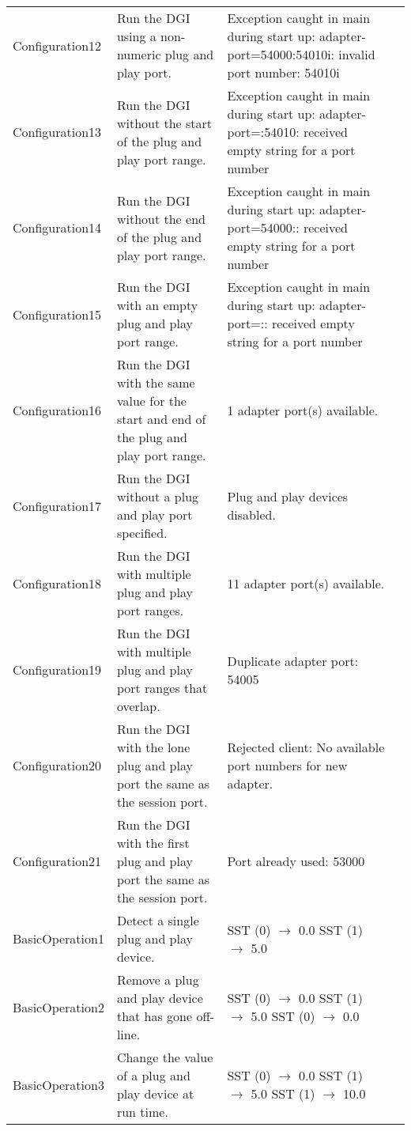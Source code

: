 \documentclass{article}
\begin{document}
\begin{center}
\begin{footnotesize}
\begin{longtable}{|p{3cm}|p{4cm}|p{10cm}|c|}
    Configuration12 & Run the DGI using a non-numeric plug and play port. & Exception caught in main during start up: adapter-port=54000:54010i: invalid port number: 54010i & \\
    Configuration13 & Run the DGI without the start of the plug and play port range. & Exception caught in main during start up: adapter-port=:54010: received empty string for a port number & \\
    Configuration14 & Run the DGI without the end of the plug and play port range. & Exception caught in main during start up: adapter-port=54000:: received empty string for a port number & \\
    Configuration15 & Run the DGI with an empty plug and play port range. & Exception caught in main during start up: adapter-port=:: received empty string for a port number & \\
    Configuration16 & Run the DGI with the same value for the start and end of the plug and play port range. & 1 adapter port(s) available. & \\
    Configuration17 & Run the DGI without a plug and play port specified. & Plug and play devices disabled. & \\
    Configuration18 & Run the DGI with multiple plug and play port ranges. & 11 adapter port(s) available. & \\
    Configuration19 & Run the DGI with multiple plug and play port ranges that overlap. & Duplicate adapter port: 54005 & \\
    Configuration20 & Run the DGI with the lone plug and play port the same as the session port. & Rejected client: No available port numbers for new adapter. & \\
    Configuration21 & Run the DGI with the first plug and play port the same as the session port. & Port already used: 53000 & \\
    BasicOperation1 & Detect a single plug and play device. & SST (0) $\rightarrow$ 0.0 \newline SST (1) $\rightarrow$ 5.0 & \\
    BasicOperation2 & Remove a plug and play device that has gone off-line. & SST (0) $\rightarrow$ 0.0 \newline SST (1) $\rightarrow$ 5.0 \newline SST (0) $\rightarrow$ 0.0 & \\
    BasicOperation3 & Change the value of a plug and play device at run time. & SST (0) $\rightarrow$ 0.0 \newline SST (1) $\rightarrow$ 5.0 \newline SST (1) $\rightarrow$ 10.0 & \\

\end{longtable}
\end{footnotesize}
\end{center}
\end{document}
